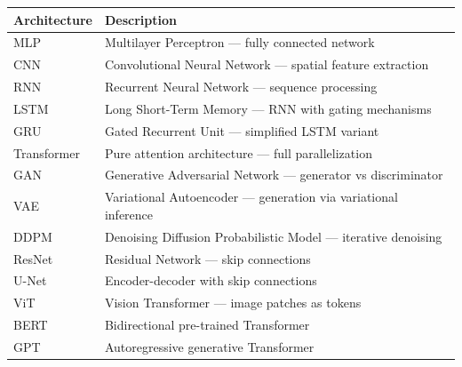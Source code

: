 \documentclass[12pt,a4paper,twoside]{book}
\theoremstyle{definition}
\theoremstyle{plain}
\theoremstyle{remark}
\begin{document}
\begin{longtable}{lp{10cm}}
\toprule
\textbf{Architecture} & \textbf{Description} \\
\midrule
\endhead
MLP & Multilayer Perceptron --- fully connected network \\
CNN & Convolutional Neural Network --- spatial feature extraction \\
RNN & Recurrent Neural Network --- sequence processing \\
LSTM & Long Short-Term Memory --- RNN with gating mechanisms \\
GRU & Gated Recurrent Unit --- simplified LSTM variant \\
Transformer & Pure attention architecture --- full parallelization \\
GAN & Generative Adversarial Network --- generator vs discriminator \\
VAE & Variational Autoencoder --- generation via variational inference \\
DDPM & Denoising Diffusion Probabilistic Model --- iterative denoising \\
ResNet & Residual Network --- skip connections \\
U-Net & Encoder-decoder with skip connections \\
ViT & Vision Transformer --- image patches as tokens \\
BERT & Bidirectional pre-trained Transformer \\
GPT & Autoregressive generative Transformer \\
\bottomrule
\end{longtable}
\end{document}
